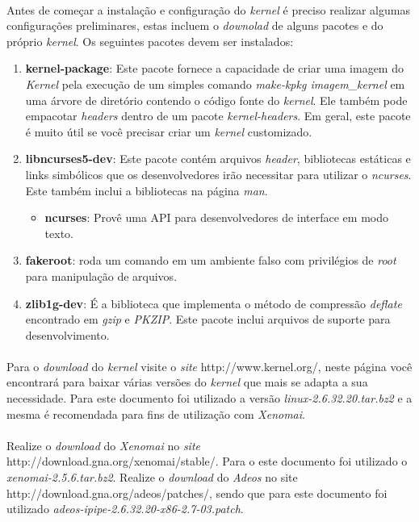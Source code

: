 \documentclass[a4paper,10pt]{article}
\begin{document}
  \paragraph{}
    Antes de começar a instalação e configuração do \emph{kernel} é preciso realizar algumas configurações preliminares, estas 
    incluem o \emph{downolad} de alguns pacotes e do próprio \emph{kernel}. Os seguintes pacotes devem ser instalados:
    \begin{enumerate}
      \item \textbf{kernel-package}: Este pacote fornece a capacidade de criar uma imagem do \emph{Kernel} pela execução de um 
	    simples comando \emph{make-kpkg imagem\_kernel} em uma árvore de diretório contendo o código fonte do \emph{kernel}. 
	    Ele também pode empacotar \emph{headers} dentro de um pacote \emph{kernel-headers}. Em geral, este pacote é muito útil 
	    se você precisar criar um \emph{kernel} customizado. 
      \item \textbf{libncurses5-dev}: Este pacote contém arquivos \emph{header}, bibliotecas estáticas e links simbólicos que os
	    desenvolvedores irão necessitar para utilizar o \emph{ncurses}. Este também inclui a bibliotecas na página \emph{man}.
	    \begin{itemize}
	      \item \textbf{ncurses}: Provê uma API para desenvolvedores de interface em modo texto. 
	    \end{itemize}
      \item \textbf{fakeroot}: roda um comando em um ambiente falso com privilégios de \emph{root} para manipulação de arquivos.
      \item \textbf{zlib1g-dev}: É a biblioteca que implementa o método de compressão \emph{deflate} encontrado em \emph{gzip} e 
	    \emph{PKZIP}. Este pacote inclui arquivos de suporte para desenvolvimento.
    \end{enumerate}

  \paragraph{}
    Para o \emph{download} do \emph{kernel} visite o \emph{site} http://www.kernel.org/, neste página você encontrará para baixar 
    várias versões do \emph{kernel} que mais se adapta a sua necessidade. Para este documento foi utilizado a versão 
    \emph{linux-2.6.32.20.tar.bz2} e a mesma é recomendada para fins de utilização com \emph{Xenomai}. 

  \paragraph{}
    Realize o \emph{download} do \emph{Xenomai} no \emph{site} http://download.gna.org/xenomai/stable/. Para o este documento foi 
    utilizado o \emph{xenomai-2.5.6.tar.bz2}. Realize o \emph{download} do \emph{Adeos} no site http://download.gna.org/adeos/patches/, 
    sendo que para este documento foi utilizado \emph{adeos-ipipe-2.6.32.20-x86-2.7-03.patch}.
\end{document}
